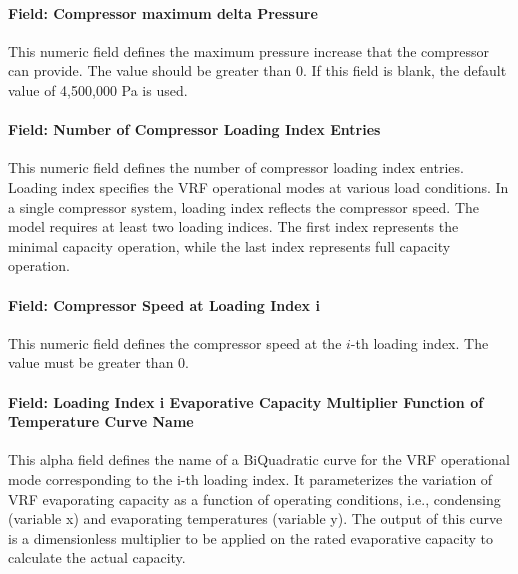 \paragraph{Field: Compressor maximum delta Pressure}\label{field-compressor-maximum-delta-pressure}

This numeric field defines the maximum pressure increase that the compressor can provide. The value should be greater than 0. If this field is blank, the default value of 4,500,000 Pa is used.

\paragraph{Field: Number of Compressor Loading Index Entries}\label{field-number-of-compressor-loading-index-entries}

This numeric field defines the number of compressor loading index entries. Loading index specifies the VRF operational modes at various load conditions. In a single compressor system, loading index reflects the compressor speed. The model requires at least two loading indices. The first index represents the minimal capacity operation, while the last index represents full capacity operation.

\paragraph{Field: Compressor Speed at Loading Index i}\label{field-compressor-speed-at-loading-index-i}

This numeric field defines the compressor speed at the $i$-th loading index. The value must be greater than 0.

\paragraph{Field: Loading Index i Evaporative Capacity Multiplier Function of Temperature Curve Name}\label{field-loading-index-i-evaporative-capacity-multiplier-function-of-temperature-curve-name}

This alpha field defines the name of a BiQuadratic curve for the VRF operational mode corresponding to the i-th loading index. It parameterizes the variation of VRF evaporating capacity as a function of operating conditions, i.e., condensing (variable x) and evaporating temperatures (variable y). The output of this curve is a dimensionless multiplier to be applied on the rated evaporative capacity to calculate the actual capacity.

